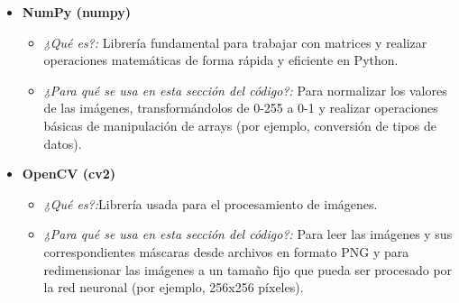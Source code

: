 \documentclass[12pt]{article}
\begin{document}
\begin{itemize}
    \item \textbf{NumPy (numpy)}
    \begin{itemize}
        \item \textit{¿Qué es?:} Librería fundamental para trabajar con matrices y realizar operaciones matemáticas de forma rápida y eficiente en Python.
    \end{itemize}
    \begin{itemize}
        \item \textit{¿Para qué se usa en esta sección del código?:} Para normalizar los valores de las imágenes, transformándolos de 0-255 a 0-1 y realizar operaciones básicas de manipulación de arrays (por ejemplo, conversión de tipos de datos).
    \end{itemize}
    
    \item \textbf{OpenCV (cv2)}
         \begin{itemize}
        \item \textit{¿Qué es?:}Librería usada para el procesamiento de imágenes.
    \end{itemize}
    \begin{itemize}
        \item \textit{¿Para qué se usa en esta sección del código?:} Para leer las imágenes y sus correspondientes máscaras desde archivos en formato PNG y para redimensionar las imágenes a un tamaño fijo que pueda ser procesado por la red neuronal (por ejemplo, 256x256 píxeles).
    \end{itemize}
    

\end{itemize}
\end{document}
